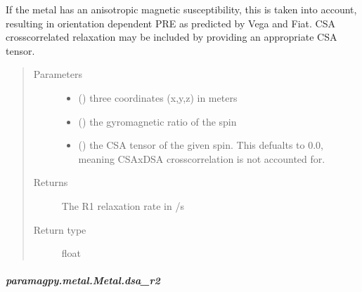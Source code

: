 \documentclass[a4paper,10pt,english,openany,oneside]{sphinxmanual}
\begin{document}
\begin{fulllineitems}
\begin{fulllineitems}
\begin{fulllineitems}
\sphinxAtStartPar
If the metal has an anisotropic magnetic susceptibility, this is
taken into account, resulting in orientation dependent PRE as
predicted by Vega and Fiat. CSA cross\sphinxhyphen{}correlated relaxation may
be included by providing an appropriate CSA tensor.
\begin{quote}\begin{description}
\item[{Parameters}] \leavevmode\begin{itemize}
\item {} 
\sphinxAtStartPar
{} () \textendash{} three coordinates (x,y,z) in meters

\item {} 
\sphinxAtStartPar
{} () \textendash{} the gyromagnetic ratio of the spin

\item {} 
\sphinxAtStartPar
{} (\sphinxstyleliteralemphasis{\sphinxupquote{ (}}\sphinxstyleliteralemphasis{\sphinxupquote{)}}) \textendash{} the CSA tensor of the given spin.
This defualts to 0.0, meaning CSAxDSA crosscorrelation is
not accounted for.

\end{itemize}

\item[{Returns}] \leavevmode
\sphinxAtStartPar
{} \textendash{} The R1 relaxation rate in /s

\item[{Return type}] \leavevmode
\sphinxAtStartPar
float

\end{description}\end{quote}

\end{fulllineitems}



\subparagraph{paramagpy.metal.Metal.dsa\_r2}
\label{\detokenize{reference/generated/paramagpy.metal.Metal.dsa_r2:paramagpy-metal-metal-dsa-r2}}\label{\detokenize{reference/generated/paramagpy.metal.Metal.dsa_r2::doc}}


\end{fulllineitems}
\end{fulllineitems}
\end{document}
